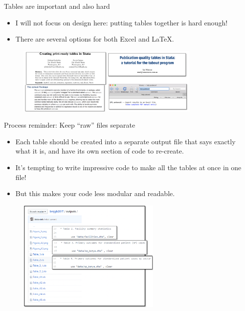 \documentclass[aspectratio=169]{beamer}
\begin{document}
\begin{frame}{Tables are important and also hard}
		
		\begin{itemize}[<default overlay specification>]
			\item<1> I will not focus on design here: putting tables together is hard enough!
			\item<1> There are several options for both Excel and LaTeX.
		\end{itemize}
		
		\begin{figure}
			\centering
			\includegraphics[width=90mm]{img/Table2}
		\end{figure}
		
\end{frame}


\begin{frame}{Process reminder: Keep “raw” files separate}
	\begin{multicols}{2}	
		
		\begin{itemize}[<default overlay specification>]
			\item<1> Each table should be created into a separate output file that says exactly what it is, and have its own section of code to re-create.
			\item<1> It’s tempting to write impressive code to make all the tables at once in one file!
			\item<1> But this makes your code less modular and readable.
		\end{itemize}
		
		\begin{figure}
			\centering
			\includegraphics[width=70mm]{img/Raw}
		\end{figure}
		
	\end{multicols}
\end{frame}
\end{document}
